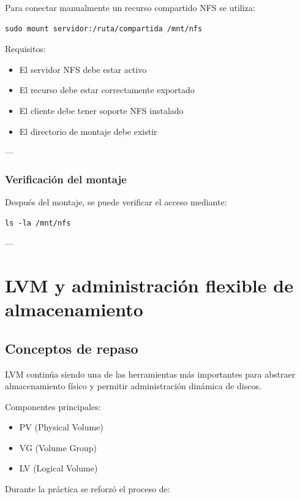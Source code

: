 \documentclass[11pt, letterpaper]{article}
\begin{document}
Para conectar manualmente un recurso compartido NFS se utiliza:

\begin{verbatim}
sudo mount servidor:/ruta/compartida /mnt/nfs
\end{verbatim}

Requisitos:

\begin{itemize}
\item El servidor NFS debe estar activo
\item El recurso debe estar correctamente exportado
\item El cliente debe tener soporte NFS instalado
\item El directorio de montaje debe existir
\end{itemize}

---
\subsubsection{Verificación del montaje}
\label{sec:org69cc27c}

Después del montaje, se puede verificar el acceso mediante:

\begin{verbatim}
ls -la /mnt/nfs
\end{verbatim}

---
\section{LVM y administración flexible de almacenamiento}
\label{sec:org89dc2a2}

\subsection{Conceptos de repaso}
\label{sec:org9d94b42}

LVM continúa siendo una de las herramientas más importantes para abstraer almacenamiento físico y permitir administración dinámica de discos.

Componentes principales:

\begin{itemize}
\item PV (Physical Volume)
\item VG (Volume Group)
\item LV (Logical Volume)
\end{itemize}

Durante la práctica se reforzó el proceso de:
\end{document}

